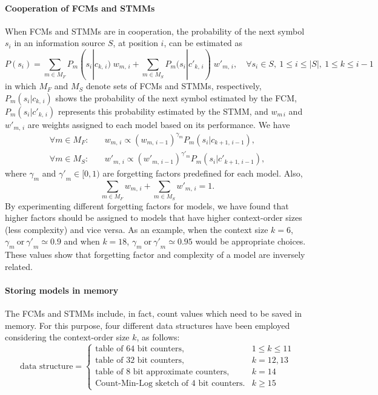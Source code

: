 \paragraph{Cooperation of FCMs and STMMs} \label{sec.coop}
When FCMs and STMMs are in cooperation, the probability of the next symbol $s_i$ in an information source $S$, at position $i$, can be estimated as
\begin{equation} \label{eq.coop}
  P(s_i) = \sum_{m\in M_F} P_m(s_i|c_{k,\,i})\;w_{m,\,i} + \sum_{m\in M_S} P_m(s_i|{c'}_{k,\,i})\;{w'}_{m,\,i}, \quad\forall s_i\in S,~1\le i\le |S|,~1\le k\le i-1
\end{equation}
in which $M_F$ and $M_S$ denote sets of FCMs and STMMs, respectively, $P_m(s_i|c_{k,\,i})$ shows the probability of the next symbol estimated by the FCM, $P_m(s_i|{c'}_{k,\,i})$ represents this probability estimated by the STMM, and $w_{m\,i}$ and ${w'}_{m,\,i}$ are weights assigned to each model based on its performance. We have
\begin{align}
  \forall m\in M_F: \quad & w_{m,\,i} \propto (w_{m,\,i-1})^{\gamma_m} P_m(s_i|c_{k+1,\,i-1}),
  \nonumber
  \\[1mm]
  \forall m\in M_S: \quad & {w'}_{m,\,i} \propto ({w'}_{m,\,i-1})^{{\gamma'}_m} P_m(s_i|{c'}_{k+1,\,i-1}),
\end{align}
where $\gamma_m$ and ${\gamma'}_m \in [0,1)$ are forgetting factors predefined for each model. Also,
\begin{equation}
  \sum_{m\in M_F} w_{m,\,i} + \sum_{m\in M_S} {w'}_{m,\,i} = 1.
\end{equation}
By experimenting different forgetting factors for models, we have found that higher factors should be assigned to models that have higher context-order sizes (less complexity) and vice versa. As an example, when the context size $k=6$, $\gamma_m~\mathrm{or}~{\gamma'}_m \simeq 0.9$ and when $k=18$, $\gamma_m~\mathrm{or}~{\gamma'}_m \simeq 0.95$ would be appropriate choices. These values show that forgetting factor and complexity of a model are inversely related.

\paragraph{Storing models in memory}
The FCMs and STMMs include, in fact, count values which need to be saved in memory. For this purpose, four different data structures have been employed considering the context-order size $k$, as follows:
\begin{equation*}
  \textrm{data structure} =
  \begin{cases}
    \textrm{table of 64 bit counters},               & 1 \leq k \leq 11 \\
    \textrm{table of 32 bit counters},               & k=12, 13         \\
    \textrm{table of 8 bit approximate counters},    & k=14             \\
    \textrm{Count-Min-Log sketch of 4 bit counters}. & k \ge 15
  \end{cases}
\end{equation*}

